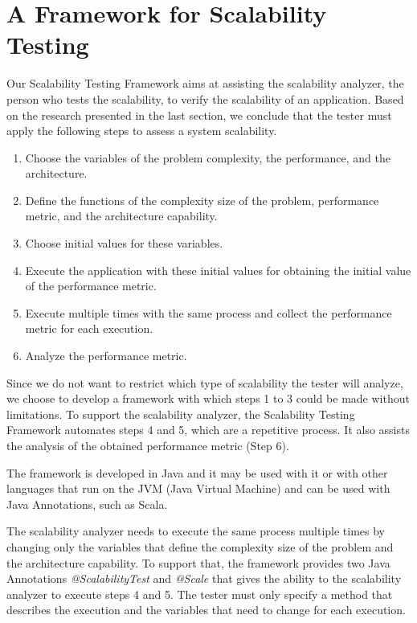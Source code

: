 \section{A Framework for Scalability Testing}
\label{framework}

Our Scalability Testing Framework aims at assisting the scalability analyzer, the person who tests the scalability, to verify the scalability of an application. Based on the research presented in the last section, we conclude that the tester must apply the following steps to assess a system scalability. 

\begin{enumerate}
\item Choose the variables of the problem complexity, the performance, and the architecture.
\item Define the functions of the complexity size of the problem, performance metric, and the architecture capability.
\item Choose initial values for these variables.
\item Execute the application with these initial values for obtaining the initial value of the performance metric.
\item Execute multiple times with the same process and collect the performance metric for each execution.
\item Analyze the performance metric.
\end{enumerate}

Since we do not want to restrict which type of scalability the tester will analyze, we choose to develop a framework with which steps 1 to 3 could be made without limitations.
To support the scalability analyzer, the Scalability Testing Framework automates steps 4 and 5, which are a repetitive process. It also assists the analysis of the obtained performance metric (Step 6).

The framework is developed in Java and it may be used with it or with other languages that run on the JVM (Java Virtual Machine) and can be used with Java Annotations, such as Scala.

The scalability analyzer needs to execute the same process multiple times by changing only the variables that define the complexity size of the problem and the architecture capability. To support that, the framework provides two Java Annotations \emph{@ScalabilityTest} and \emph{@Scale} that gives the ability to the scalability analyzer to execute steps 4 and 5. The tester must only specify a method that describes the execution and the variables that need to change for each execution.

